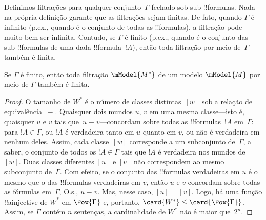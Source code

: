 \documentclass[../../../include/open-logic-section]{subfiles}
\begin{document}


Definimos filtrações para qualquer conjunto~$\Gamma$ fechado sob
sub-!!{formula}s. Nada na própria definição garante que as filtrações
sejam finitas. De fato, quando $\Gamma$ é infinito (p.ex., quando é
o conjunto de todas as !!{formula}s), a filtração pode muito bem ser
infinita. Contudo, se $\Gamma$ é finito (p.ex., quando é o conjunto
das sub-!!{formula}s de uma dada !!{formula}~$!A$), então toda filtração
por meio de~$\Gamma$ também é finita.

\begin{prop}
  Se $\Gamma$ é finito, então toda filtração $\mModel{M^*}$ de um modelo
  $\mModel{M}$ por meio de $\Gamma$ também é finita.
\end{prop}

\begin{proof}
  O tamanho de $W^*$ é o número de classes distintas~$[w]$ sob a relação
  de equivalência~$\equiv$. Quaisquer dois mundos $u$, $v$ em uma mesma
  classe---isto é, quaisquer $u$ e $v$ tais que~$u \equiv v$---concordam
  sobre todas as !!{formula}s~$!A$ em~$\Gamma$: para $!A \in \Gamma$,
  ou $!A$ é verdadeira tanto em $u$ quanto em $v$, ou não é verdadeira
  em nenhum deles. Assim, cada classe~$[w]$ corresponde a um subconjunto
  de~$\Gamma$, a saber, o conjunto de todos os $!A \in \Gamma$ tais que
  $!A$ é verdadeira nos mundos de~$[w]$. Duas classes diferentes $[u]$
  e $[v]$ não correspondem ao mesmo subconjunto de~$\Gamma$. Com efeito,
  se o conjunto das !!{formula}s verdadeiras em $u$ é o mesmo que o das
  !!{formula}s verdadeiras em $v$, então $u$ e $v$ concordam sobre todas
  as fórmulas em~$\Gamma$, O.s.\@, $u \equiv v$. Mas, nesse caso,
  $[u] = [v]$. Logo, há uma função !!a{injective} de $W^*$ em
  $\Pow{\Gamma}$ e, portanto, $\card{W^*} \le \card{\Pow{\Gamma}}$.
  Assim, se $\Gamma$ contém $n$ sentenças, a cardinalidade de $W^*$ não
  é maior que~$2^n$.
\end{proof}
\end{document}
